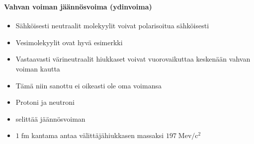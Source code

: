 \begin{frame}
\frametitle{\texorpdfstring{\culine[\sectiontitleulinecolor]{\sectiontitle}}{\sectiontitle} }
\framesubtitle{Vahvan voiman jäännösvoima (ydinvoima)}%
\appear{}

\begin{itemize}[itemsep=2.2mm]
	\item Sähköisesti neutraalit molekyylit voivat polarisoitua sähköisesti 
	\item Vesimolekyylit ovat hyvä esimerkki  
	\item Vastaavasti värineutraalit hiukkaset voivat vuorovaikuttaa keskenään vahvan voiman kautta 
	
\item Tämä niin sanottu  ei oikeasti ole oma voimansa

\item Protoni ja neutroni   
\item {} selittää jäännösvoiman  
\item $1 \mathrm{\;fm}$ kantama antaa välittäjähiukkasen massaksi $197 \mathrm{\;Mev} / \mathrm{c}^{2}$
\end{itemize}

\endofslide 
\end{frame}

